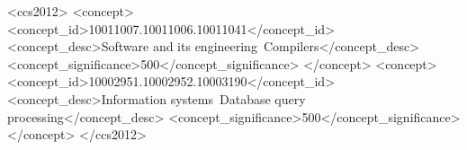 \documentclass[sigplan,screen,10pt]{acmart}\settopmatter{}
\begin{document}




\begin{abstract}

\end{abstract}


\begin{CCSXML}
<ccs2012>
<concept>
<concept_id>10011007.10011006.10011041</concept_id>
<concept_desc>Software and its engineering~Compilers</concept_desc>
<concept_significance>500</concept_significance>
</concept>
<concept>
<concept_id>10002951.10002952.10003190</concept_id>
<concept_desc>Information systems~Database query processing</concept_desc>
<concept_significance>500</concept_significance>
</concept>
</ccs2012>
\end{CCSXML}



\end{document}
